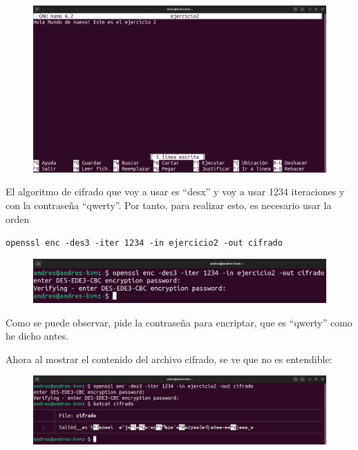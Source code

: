 \documentclass{article}
\begin{document}
\begin{figure}[H]
    \includegraphics[width=\textwidth]{imagenes/Captura desde 2022-10-19 17-33-08.png}
\end{figure}

El algoritmo de cifrado que voy a usar es ``desx'' y voy a usar 1234 iteraciones y con la contraseña ``qwerty''. Por tanto, para realizar esto, es necesario usar la orden 

\verb|openssl enc -des3 -iter 1234 -in ejercicio2 -out cifrado|

\begin{figure}[H]
    \includegraphics[width=\textwidth]{imagenes/Captura desde 2022-10-19 17-44-41.png}
\end{figure}

Como se puede observar, pide la contraseña para encriptar, que es ``qwerty'' como he dicho antes. 

\bigskip

Ahora al mostrar el contenido del archivo cifrado, se ve que no es entendible:

\begin{figure}[H]
    \includegraphics[width=\textwidth]{imagenes/Captura desde 2022-10-19 17-44-49.png}
\end{figure}
\end{document}
